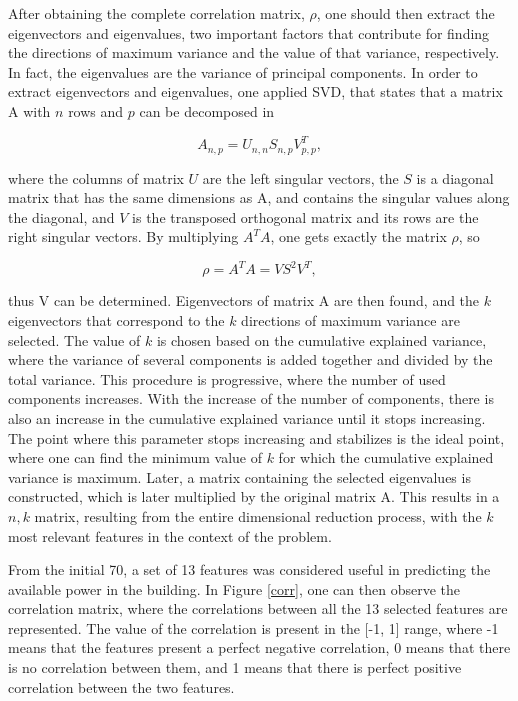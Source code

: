 After obtaining the complete correlation matrix, $\rho$, one should then extract the eigenvectors and eigenvalues, two important factors that contribute for finding the directions of maximum variance and the value of that variance, respectively. In fact, the eigenvalues are the variance of principal components. In order to extract eigenvectors and eigenvalues, one applied \ac{SVD}, that states that a matrix A with $n$ rows and $p$ can be decomposed in 

\begin{equation}
   A_{n,p} = U_{n,n} S_{n,p} V^T_{p,p},
   \label{PCA3}
\end{equation}

where the columns of matrix $U$ are the left singular vectors, the $S$ is a diagonal matrix that has the same dimensions as A, and contains the singular values along the diagonal, and $V$ is the transposed orthogonal matrix and its rows are the right singular vectors. By multiplying $A^TA$, one gets exactly the matrix $\rho$, so 

\begin{equation}
   \rho = A^TA = VS^2V^T,
   \label{PCA4}
\end{equation}

thus V can be determined. Eigenvectors of matrix A are then found, and the $k$ eigenvectors that correspond to the $k$ directions of maximum variance are selected. The value of $k$ is chosen based on the cumulative explained variance, where the variance of several components is added together and divided by the total variance. This procedure is progressive, where the number of used components increases. With the increase of the number of components, there is also an increase in the cumulative explained variance until it stops increasing. The point where this parameter stops increasing and stabilizes is the ideal point, where one can find the minimum value of $k$ for which the cumulative explained variance is maximum. Later, a matrix containing the selected eigenvalues is constructed, which is later multiplied by the original matrix A. This results in a $n,k$ matrix, resulting from the entire dimensional reduction process, with the $k$ most relevant features in the context of the problem.

From the initial 70, a set of 13 features was considered useful in predicting the available power in the building. In Figure \ref{corr}, one can then observe the correlation matrix, where the correlations between all the 13 selected features are represented. The value of the correlation is present in the [-1, 1] range, where -1 means that the features present a perfect negative correlation, 0 means that there is no correlation between them, and 1 means that there is perfect positive correlation between the two features. 



